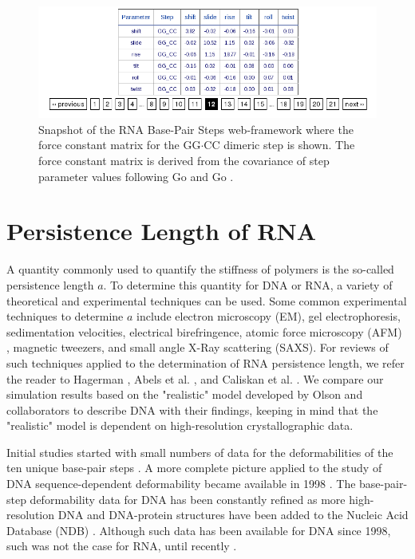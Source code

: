 \begin{figure}[htbp]
\centering
\includegraphics[angle=0, scale=0.6]{Chapter4/forceconst.png}
\caption{Snapshot of  the RNA Base-Pair Steps  web-framework where the
  force constant matrix for the GG$\cdot$CC dimeric step is shown. The
  force  constant  matrix  is  derived  from the  covariance  of  step
  parameter values following Go and Go \cite{go1976}.}
\label{fig:forceconst}
\end{figure}  

\section{Persistence Length of RNA}
A quantity commonly used to  quantify the stiffness of polymers is the
so-called persistence  length $a$. To determine this  quantity for DNA
or RNA,  a variety of  theoretical and experimental techniques  can be
used.  Some  common experimental  techniques to determine  $a$ include
electron   microscopy   (EM),   gel   electrophoresis,   sedimentation
velocities, electrical birefringence,  atomic force microscopy (AFM) ,
magnetic  tweezers,  and small  angle  X-Ray  scattering (SAXS).   For
reviews  of  such  techniques  applied  to the  determination  of  RNA
persistence    length,    we   refer    the    reader   to    Hagerman
\cite{hagerman1997}, Abels  et al.  \cite{abels2005},  and Caliskan et
al.  \cite{caliskan2005}.  We compare our simulation results based on
the   "realistic"   model  developed   by   Olson  and   collaborators
\cite{olson1995} to describe DNA  with their findings, keeping in mind
that   the   "realistic"  model   is   dependent  on   high-resolution
crystallographic data.

Initial  studies   started  with  small   numbers  of  data   for  the
deformabilities of the ten unique base-pair steps \cite{olson1995}.  A
more complete  picture applied to the study  of DNA sequence-dependent
deformability   became  available   in  1998   \cite{olson1998}.   The
base-pair-step deformability data for  DNA has been constantly refined
as more high-resolution DNA and DNA-protein structures have been added
to  the   Nucleic  Acid  Database   (NDB)  \cite{balasubramanian2009}.
Although such data has been available for DNA since 1998, such was not
the case for RNA, until recently \cite{olson2009}.

